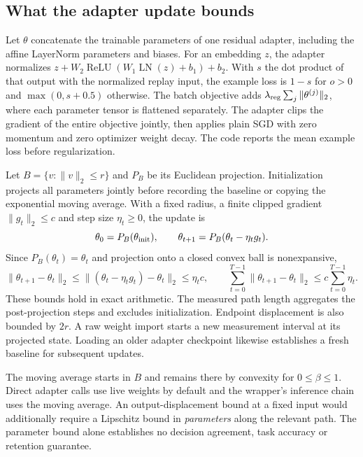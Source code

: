 \subsection{What the adapter update bounds}

Let $\theta$ concatenate the trainable parameters of one residual adapter,
including the affine LayerNorm parameters and biases. For an embedding $z$,
the adapter normalizes $z+W_2\operatorname{ReLU}(W_1\operatorname{LN}(z)
+b_1)+b_2$. With $s$ the dot product of that output with the normalized replay
input, the example loss is $1-s$ for $o>0$ and $\max(0,s+0.5)$ otherwise.
The batch objective adds $\lambda_{\rm reg}\sum_j\|\theta^{(j)}\|_2$,
where each parameter tensor is flattened separately. The adapter clips
the gradient of the entire objective jointly, then applies plain SGD with
zero momentum and zero optimizer weight decay. The code reports the mean
example loss before regularization.

Let $B=\{v:\|v\|_2\leq r\}$ and $P_B$ be its Euclidean projection.
Initialization projects all parameters jointly before recording the baseline
or copying the exponential moving average. With a fixed radius, a finite
clipped gradient $\|g_t\|_2\leq c$ and step size $\eta_t\geq 0$, the update is
\[
 \theta_0=P_B(\theta_{\rm init}),\qquad
 \theta_{t+1}=P_B(\theta_t-\eta_t g_t).
\]
Since $P_B(\theta_t)=\theta_t$ and projection onto a closed convex ball
is nonexpansive,
\[
 \|\theta_{t+1}-\theta_t\|_2
 \leq\|(\theta_t-\eta_t g_t)-\theta_t\|_2\leq\eta_t c,\qquad
 \sum_{t=0}^{T-1}\|\theta_{t+1}-\theta_t\|_2\leq c\sum_{t=0}^{T-1}\eta_t .
\]
These bounds hold in exact arithmetic. The measured path length
aggregates the post-projection steps and excludes initialization. Endpoint
displacement is also bounded by $2r$. A raw weight import starts a new
measurement interval at its projected state. Loading an older adapter checkpoint
likewise establishes a fresh baseline for subsequent updates.

The moving average starts in $B$ and remains there by convexity for
$0\leq\beta\leq1$. Direct adapter calls use live weights by default and the
wrapper's inference chain uses the moving average. An output-displacement
bound at a fixed input would additionally require a Lipschitz bound in
\emph{parameters} along the relevant path. The parameter bound alone
establishes no decision agreement, task accuracy or retention guarantee.
